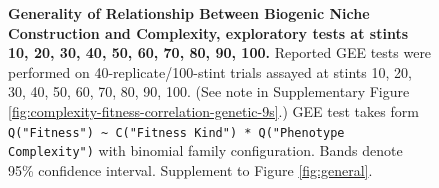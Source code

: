 \begin{figure}
\caption{%
\textbf{Generality of Relationship Between Biogenic Niche Construction and Complexity, exploratory tests at stints 10, 20, 30, 40, 50, 60, 70, 80, 90, 100.}
\footnotesize
Reported GEE tests were performed on 40-replicate/100-stint trials assayed at stints 10, 20, 30, 40, 50, 60, 70, 80, 90, 100.
(See note in Supplementary Figure \ref{fig:complexity-fitness-correlation-genetic-9s}.)
GEE test takes form \texttt{Q("Fitness") \textasciitilde{} C("Fitness Kind") * Q("Phenotype Complexity")} with binomial family configuration.
Bands denote 95\% confidence interval.
Supplement to Figure \ref{fig:general}.
}
\label{fig:general-supp-geenobg-0s}

\end{figure}
